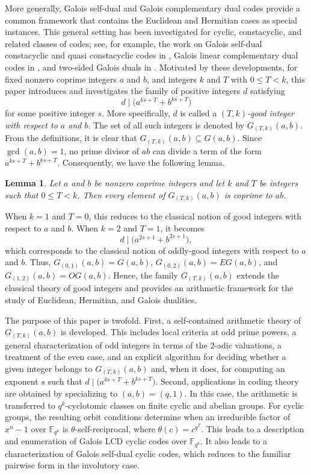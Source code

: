 \documentclass[pdflatex,sn-mathphys-num]{sn-jnl}%
\theoremstyle{thmstyleone}%
\newtheorem{lemma}[theorem]{Lemma}%
\theoremstyle{thmstyletwo}%
\theoremstyle{thmstylethree}%
\newcommand{\F}{\mathbb{F}}
\begin{document}
 More generally, Galois self-dual and Galois complementary dual codes provide a common framework that contains the Euclidean and Hermitian cases as special instances. This general setting has been investigated for cyclic, constacyclic, and related classes of codes; see, for example, the work on Galois self-dual constacyclic and  quasi constacyclic codes in \cite{FanZhang2017, FL2024},   Galois linear complementary dual codes in \cite{LiuLiu2018, LLY2020}, and  two-sided Galois duals  in \cite{T2023}. 
Motivated by these developments, for fixed nonzero coprime integers $a$ and $b$, and integers $k$ and $T$ with $0\le T<k$, this paper introduces and investigates the family of positive integers $d$ satisfying
\[
d\mid \bigl(a^{ks+T}+b^{ks+T}\bigr)
\]
for some positive integer $s$. More specifically, $d$ is called a \emph{$(T,k)$-good integer with respect to $a$ and $b$}. The set of all such integers is denoted by $
G_{(T,k)}(a,b)$. From the definitions, it is clear that $
G_{(T,k)}(a,b) \subseteq G(a,b)$.
Since $\gcd(a,b)=1$, no prime divisor of $ab$ can divide a term of the form $a^{ks+T}+b^{ks+T}$. Consequently,  we have the following lemma. 
\begin{lemma}\label{lem:coprime-to-ab}
Let $a$ and $b$ be nonzero coprime integers and let $k$ and $T$ be integers such that $0\leq T<k$. Then every element of $G_{(T,k)}(a,b)$ is coprime to $ab$.
\end{lemma}
When $k=1$ and $T=0$, this reduces to the classical notion of good integers with respect to  $a$ and $b$. When $k=2$  and $T=1$, it becomes
\[
d\mid \bigl(a^{2s+1}+b^{2s+1}\bigr),
\]
which corresponds to the classical notion of oddly-good integers  with respect to  $a$ and $b$. Thus, $G_{(0,1)}(a,b)= G(a,b)$, $G_{(0,2)}(a,b)= EG(a,b)$,  and $G_{(1,2)}(a,b)= OG(a,b)$.  Hence, the family $G_{(T,k)}(a,b)$ extends the classical theory of good integers and provides an   arithmetic framework for the   study of Euclidean, Hermitian, and Galois dualities.

The purpose of this paper is twofold. First, a self-contained arithmetic theory of $G_{(T,k)}(a,b)$ is developed. This includes local criteria at odd prime powers,  a general   characterization of odd integers in terms of the $2$-adic valuations, a treatment of the even case, and an explicit algorithm for deciding whether a given integer belongs to $G_{(T,k)}(a,b)$ and,  when it does, for computing an exponent $s$ such that $
d\mid \bigl(a^{ks+T}+b^{ks+T}\bigr)$. Second, applications in coding theory are obtained by specializing to $(a,b)=(q,1)$. In this case, the arithmetic is transferred to $q^k$-cyclotomic classes on finite cyclic and abelian groups. For cyclic groups, the resulting orbit conditions determine when an irreducible factor of $x^n-1$ over $\F_{q^k}$ is $\theta$-self-reciprocal, where $\theta(c)=c^{q^T}$. This leads to a description and enumeration of Galois LCD cyclic codes over $\F_{q^k}$. It also leads to a characterization of Galois self-dual  cyclic codes, which reduces to the familiar pairwise form in the involutory case.
 
\end{document}
